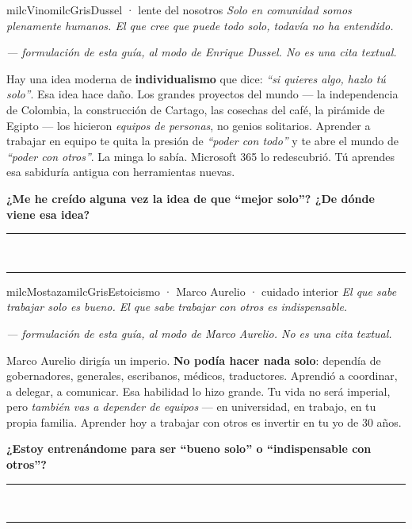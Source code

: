 \documentclass[11pt,letterpaper]{article}
\newcommand{\linead}[1]{\noindent\color{milcLinea}\rule{#1}{0.5pt}\color{milcNegro}}
\begin{document}
\begin{softbox}{milcVino}{milcGris}{Dussel · lente del nosotros}
\textit{Solo en comunidad somos plenamente humanos. El que cree que puede todo solo, todavía no ha entendido.}

{\footnotesize\itshape\color{milcNegro!70}--- formulación de esta guía, al modo de Enrique Dussel. No es una cita textual.}

Hay una idea moderna de \textbf{individualismo} que dice: \emph{``si quieres algo, hazlo tú solo''}. Esa idea hace daño. Los grandes proyectos del mundo --- la independencia de Colombia, la construcción de Cartago, las cosechas del café, la pirámide de Egipto --- los hicieron \emph{equipos de personas}, no genios solitarios. Aprender a trabajar en equipo te quita la presión de \emph{``poder con todo''} y te abre el mundo de \emph{``poder con otros''}. La minga lo sabía. Microsoft 365 lo redescubrió. Tú aprendes esa sabiduría antigua con herramientas nuevas.

\textbf{¿Me he creído alguna vez la idea de que ``mejor solo''? ¿De dónde viene esa idea?}
\end{softbox}
\linead{\linewidth}\\[1mm]
\linead{\linewidth}

\begin{softbox}{milcMostaza}{milcGris}{Estoicismo · Marco Aurelio · cuidado interior}
\textit{El que sabe trabajar solo es bueno. El que sabe trabajar con otros es indispensable.}

{\footnotesize\itshape\color{milcNegro!70}--- formulación de esta guía, al modo de Marco Aurelio. No es una cita textual.}

Marco Aurelio dirigía un imperio. \textbf{No podía hacer nada solo}: dependía de gobernadores, generales, escribanos, médicos, traductores. Aprendió a coordinar, a delegar, a comunicar. Esa habilidad lo hizo grande. Tu vida no será imperial, pero \emph{también vas a depender de equipos} --- en universidad, en trabajo, en tu propia familia. Aprender hoy a trabajar con otros es invertir en tu yo de 30 años.

\textbf{¿Estoy entrenándome para ser ``bueno solo'' o ``indispensable con otros''?}
\end{softbox}
\linead{\linewidth}\\[1mm]
\linead{\linewidth}
\end{document}
